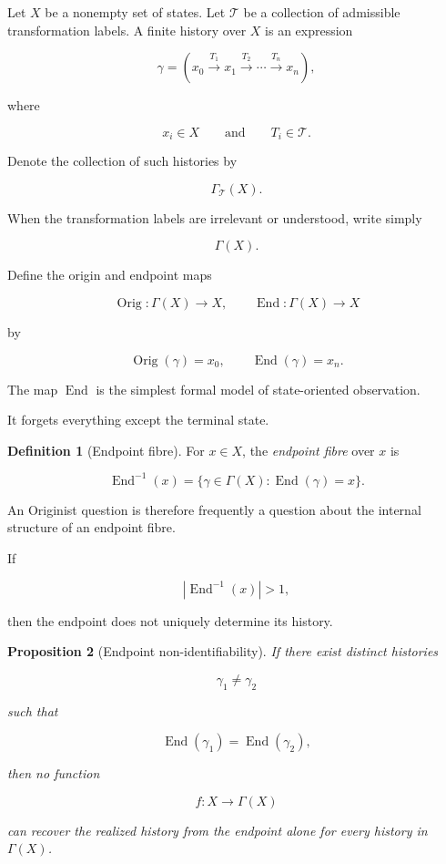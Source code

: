 \documentclass[
  11pt,
  a4paper,
  DIV=12,
  BCOR=0mm,
  parskip=half-
]{scrartcl}
\newcommand{\End}{\operatorname{End}}
\newcommand{\Orig}{\operatorname{Orig}}
\theoremstyle{definition}
\newtheorem{definition}{Definition}[section]
\theoremstyle{plain}
\newtheorem{proposition}[definition]{Proposition}
\theoremstyle{remark}
\begin{document}
Let \(X\) be a nonempty set of states. Let \(\mathcal T\) be a collection of
admissible transformation labels. A finite history over \(X\) is an expression

\[
  \gamma
  =
  \left(
  x_0
  \xrightarrow{T_1}
  x_1
  \xrightarrow{T_2}
  \cdots
  \xrightarrow{T_n}
  x_n
  \right),
\]

where

\[
  x_i\in X
  \qquad\text{and}\qquad
  T_i\in\mathcal T.
\]

Denote the collection of such histories by

\[
  \Gamma_{\mathcal T}(X).
\]

When the transformation labels are irrelevant or understood, write simply

\[
  \Gamma(X).
\]

Define the origin and endpoint maps

\[
  \Orig:\Gamma(X)\to X,
  \qquad
  \End:\Gamma(X)\to X
\]

by

\[
  \Orig(\gamma)=x_0,
  \qquad
  \End(\gamma)=x_n.
\]

The map \(\End\) is the simplest formal model of state-oriented observation.

It forgets everything except the terminal state.

\begin{definition}[Endpoint fibre]
\label{def:endpoint-fibre}
For \(x\in X\), the \emph{endpoint fibre} over \(x\) is

\[
  \End^{-1}(x)
  =
  \{
    \gamma\in\Gamma(X)
    :
    \End(\gamma)=x
  \}.
\]
\end{definition}

An Originist question is therefore frequently a question about the internal
structure of an endpoint fibre.

If

\[
  |\End^{-1}(x)|>1,
\]

then the endpoint does not uniquely determine its history.

\begin{proposition}[Endpoint non-identifiability]
\label{prop:endpoint-nonidentifiability}
If there exist distinct histories

\[
  \gamma_1\neq\gamma_2
\]

such that

\[
  \End(\gamma_1)=\End(\gamma_2),
\]

then no function

\[
  f:X\to\Gamma(X)
\]

can recover the realized history from the endpoint alone for every history in
\(\Gamma(X)\).
\end{proposition}
\end{document}
